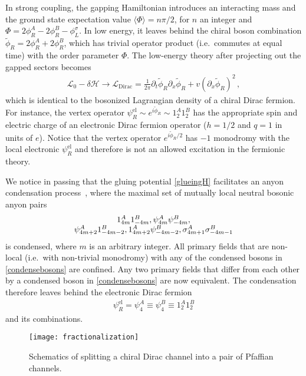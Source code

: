 In strong coupling, the gapping Hamiltonian introduces an interacting mass and the ground state expectation value $\langle\Phi\rangle=n\pi/2$, for $n$ an integer and $\Phi=2\phi^A_R-2\phi^B_R-\phi^\sigma_L$. In low energy, it leaves behind the chiral boson combination $\tilde\phi_R=2\phi_R^A+2\phi_R^B$, which has trivial operator product (i.e.~commutes at equal time) with the order parameter $\Phi$. The low-energy theory after projecting out the gapped sectors becomes \begin{align}\mathcal{L}_0-\delta\mathcal{H}\longrightarrow\mathcal{L}_{\mathrm{Dirac}}=\frac{1}{2\pi}\partial_t\tilde\phi_R\partial_x\tilde\phi_R+v(\partial_x\tilde\phi_R)^2 \,, \end{align} which is identical to the bosonized Lagrangian density of a chiral Dirac fermion. For instance, the vertex operator $\psi_R^{\mathrm{el}}\sim e^{i\tilde\phi_R}\sim 1_2^A1_2^B$ has the appropriate spin and electric charge of an electronic Dirac fermion operator ($h=1/2$ and $q=1$ in units of $e$). Notice that the vertex operator $e^{i\tilde\phi_R/2}$ has $-1$ monodromy with the local electronic $\psi_R^{\mathrm{el}}$ and therefore is not an allowed excitation in the fermionic theory.

We notice in passing that the gluing potential \eqref{glueingH} facilitates an anyon condensation process~\cite{BaisSlingerlandCondensation}, where the maximal set of mutually local neutral bosonic anyon pairs \begin{align}\begin{array}{*{20}c}1_{4m}^A1_{-4m}^B,\psi_{4m}^A\psi_{-4m}^B,\\\psi_{4m+2}^A1_{-4m-2}^B,1_{4m+2}^A\psi_{-4m-2}^B,\sigma_{4m+1}^A\sigma_{-4m-1}^B\end{array}\label{condensebosons}\end{align} is condensed, where $m$ is an arbitrary integer. All primary fields that are non-local (i.e.~with non-trivial monodromy) with any of the condensed bosons in \eqref{condensebosons} are confined. Any two primary fields that differ from each other by a condensed boson in \eqref{condensebosons} are now equivalent. The condensation therefore leaves behind the electronic Dirac fermion \begin{align}\psi^{\mathrm{el}}_R=\psi^A_4\equiv\psi^B_4\equiv1_2^A1_2^B\end{align} and its combinations. 

\begin{figure}[htbp]
	\centering\texttt{[image: fractionalization]}
	\caption{Schematics of splitting a chiral Dirac channel into a pair of Pfaffian channels.}\label{fig:fractionalization}
\end{figure}

